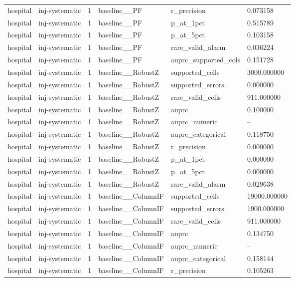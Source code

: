 \begin{tabular}{llllll}
hospital & inj-systematic & 1 & baseline\_\_PF & r\_precision & 0.073158 \\
hospital & inj-systematic & 1 & baseline\_\_PF & p\_at\_1pct & 0.515789 \\
hospital & inj-systematic & 1 & baseline\_\_PF & p\_at\_5pct & 0.103158 \\
hospital & inj-systematic & 1 & baseline\_\_PF & rare\_valid\_alarm & 0.036224 \\
hospital & inj-systematic & 1 & baseline\_\_PF & auprc\_supported\_cols & 0.151728 \\
hospital & inj-systematic & 1 & baseline\_\_RobustZ & supported\_cells & 3000.000000 \\
hospital & inj-systematic & 1 & baseline\_\_RobustZ & supported\_errors & 0.000000 \\
hospital & inj-systematic & 1 & baseline\_\_RobustZ & rare\_valid\_cells & 911.000000 \\
hospital & inj-systematic & 1 & baseline\_\_RobustZ & auprc & 0.100000 \\
hospital & inj-systematic & 1 & baseline\_\_RobustZ & auprc\_numeric & -- \\
hospital & inj-systematic & 1 & baseline\_\_RobustZ & auprc\_categorical & 0.118750 \\
hospital & inj-systematic & 1 & baseline\_\_RobustZ & r\_precision & 0.000000 \\
hospital & inj-systematic & 1 & baseline\_\_RobustZ & p\_at\_1pct & 0.000000 \\
hospital & inj-systematic & 1 & baseline\_\_RobustZ & p\_at\_5pct & 0.000000 \\
hospital & inj-systematic & 1 & baseline\_\_RobustZ & rare\_valid\_alarm & 0.029638 \\
hospital & inj-systematic & 1 & baseline\_\_ColumnIF & supported\_cells & 19000.000000 \\
hospital & inj-systematic & 1 & baseline\_\_ColumnIF & supported\_errors & 1900.000000 \\
hospital & inj-systematic & 1 & baseline\_\_ColumnIF & rare\_valid\_cells & 911.000000 \\
hospital & inj-systematic & 1 & baseline\_\_ColumnIF & auprc & 0.134750 \\
hospital & inj-systematic & 1 & baseline\_\_ColumnIF & auprc\_numeric & -- \\
hospital & inj-systematic & 1 & baseline\_\_ColumnIF & auprc\_categorical & 0.158144 \\
hospital & inj-systematic & 1 & baseline\_\_ColumnIF & r\_precision & 0.105263 \\

\end{tabular}
